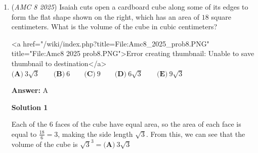 \begin{enumerate}
\begin{itemize}
        \item $27$ students earned a score of at least $85\%$

        \item $50$ students earned a score of at least $80\%$
            \end{itemize}
            How many students earned a score of at least $80\%$ and less than $90\%$?


 $\textbf{(A)}\ 8\qquad \textbf{(B)}\ 14\qquad \textbf{(C)}\ 22\qquad \textbf{(D)}\ 37\qquad \textbf{(E)}\ 45$

 \textbf{Answer: }D



\textbf{Solution 1}

$50$ people scored at least $80\%$, and out of these $50$ people, $13$ of them earned a score that was not less than $90\%$, so the number of people that scored in between at least $80\%$ and less than $90\%$ is $50-13 = \boxed{\text{(D)\ 37}}$.

 



\textbf{Solution 2}

Let $a$ denote the number of people who had a score of at least $85$, but less than $90$, and let $b$ denote the number of people who had a score of at least $80$ but less than $85$. Our answer is equal to $a+b$. We find $a = 27 - 13 = 14$, while $b = 50 - 27 = 23$. Thus, the answer is $23 + 14 = \boxed{\text{(D)\ 37}}$. 

 -vockey

 


	\item (\textit{AMC 8 2025}) Isaiah cuts open a cardboard cube along some of its edges to form the flat shape shown on the right, which has an area of $18$ square centimeters. What is the volume of the cube in cubic centimeters?


 <a href="/wiki/index.php?title=File:Amc8\_2025\_prob8.PNG" title="File:Amc8 2025 prob8.PNG">Error creating thumbnail: Unable to save thumbnail to destination</a>
$\textbf{(A)}~3\sqrt{3}\qquad\textbf{(B)}~6\qquad\textbf{(C)}~9\qquad\textbf{(D)}~6\sqrt{3}\qquad\textbf{(E)}~9\sqrt{3}$

 \textbf{Answer: }A



\textbf{Solution 1}

Each of the $6$ faces of the cube have equal area, so the area of each face is equal to $\frac{18}{6} = 3$, making the side length $\sqrt3$. From this, we can see that the volume of the cube is $\sqrt{3}^3 = \boxed{\textbf{(A)}~3\sqrt{3}}$





\end{enumerate}
